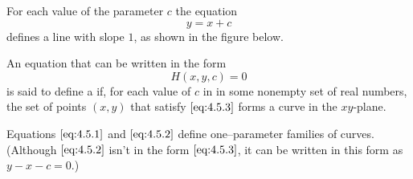 \documentclass{ximera}
\begin{document}
 
 
\begin{example} \label{example:4.5.2}
For each value of the parameter $c$ the equation
\begin{equation} \label{eq:4.5.2}
y=x+c
\end{equation}
 defines a line with slope $1$, as shown in the figure below.

\begin{center}
\end{center}
  
\end{example}
 
 
 
 
 
\begin{definition}\label{thmtype:4.5.1}
An equation that can be written in the form
 \begin{equation} \label{eq:4.5.3}
H(x,y,c)=0
\end{equation}
is said to define a  if, for
each value of $c$ in in some nonempty set of real numbers, the set of
points $(x,y)$ that satisfy  $\eqref{eq:4.5.3}$ forms a curve in the
$xy$-plane.
\end{definition}
 
Equations $\eqref{eq:4.5.1}$ and $\eqref{eq:4.5.2}$ define one--parameter families
of curves. (Although $\eqref{eq:4.5.2}$ isn't  in the form $\eqref{eq:4.5.3}$, it
can be written in this form as $y-x-c=0$.)
 
\end{document}
